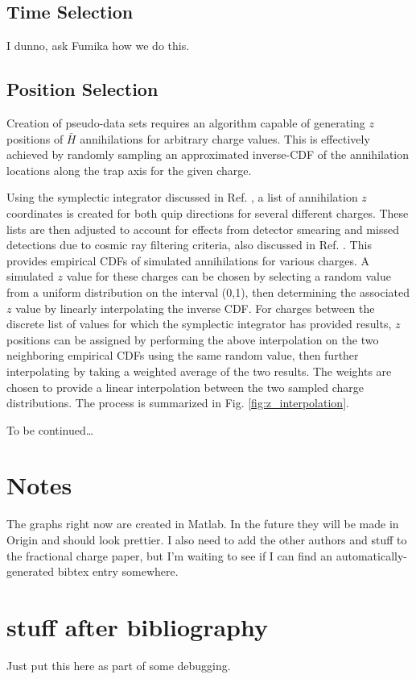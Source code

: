 \documentclass[superscriptaddress,aps,prb,11pt]{revtex4-1}
\begin{document}
\subsection*{Time Selection}
I dunno, ask Fumika how we do this.


\subsection*{Position Selection}
Creation of pseudo-data sets requires an algorithm capable of generating $z$ positions of $\bar{H}$ annihilations for arbitrary charge values.  This is effectively achieved by randomly sampling an approximated inverse-CDF of the annihilation locations along the trap axis for the given charge.

Using the symplectic integrator discussed in Ref. , a list of annihilation $z$ coordinates is created for both quip directions for several different charges.  These lists are then adjusted to account for effects from detector smearing and missed detections due to cosmic ray filtering criteria, also discussed in Ref. .  This provides empirical CDFs of simulated annihilations for various charges.  A simulated $z$ value for these charges can be chosen by selecting a random value from a uniform distribution on the interval (0,1), then determining the associated $z$ value by linearly interpolating the inverse CDF.  For charges between the discrete list of values for which the symplectic integrator has provided results, $z$ positions can be assigned by performing the above interpolation on the two neighboring empirical CDFs using the same random value, then further interpolating by taking a weighted average of the two results.  The weights are chosen to provide a linear interpolation between the two sampled charge distributions.  The process is summarized in Fig. \ref{fig:z_interpolation}.

\begin{acknowledgments}
To be continued\ldots
\end{acknowledgments}

\section{Notes}
The graphs right now are created in Matlab.  In the future they will be made in Origin and should look prettier.  I also need to add the other authors and stuff to the fractional charge paper, but I'm waiting to see if I can find an automatically-generated bibtex entry somewhere.

\nocite{fractionalcharge}



\section{stuff after bibliography}
Just put this here as part of some debugging.
\end{document}
